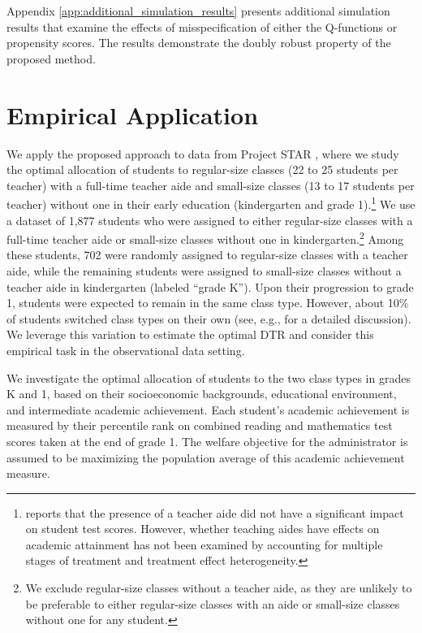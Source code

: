 Appendix \ref{app:additional_simulation_results} presents additional simulation results that examine the effects of misspecification of either the Q-functions or  propensity scores. The results demonstrate the doubly robust property of the proposed method.





\section{Empirical Application}\label{sec:empirical_illustration}

We apply the proposed approach to data from Project STAR 
\citep[e.g.,][]{krueger_1999, Ding_Lehrer_2010}, 
where we study the optimal allocation of students to regular-size classes (22 to 25 students per teacher) with a full-time teacher aide and small-size classes (13 to 17 students per teacher) without one in their early education (kindergarten and grade 1).\footnote{\cite{krueger_1999} reports that the presence of a teacher aide did not have a significant impact on student test scores. However, whether teaching aides have effects on academic attainment has not been examined by accounting for multiple stages of treatment and treatment effect heterogeneity.} We use a dataset of 1,877 students who were assigned to either regular-size classes with a full-time teacher aide or small-size classes without one in kindergarten.\footnote{We exclude regular-size classes without a teacher aide, as they are unlikely to be preferable to either regular-size classes with an aide or small-size classes without one for any student.} Among these students, 702 were randomly assigned to regular-size classes with a teacher aide, while the remaining students were assigned to small-size classes without a teacher aide in kindergarten (labeled ``grade K''). Upon their progression to grade 1, students were expected to remain in the same class type. However, about 10\% of students switched class types on their own (see, e.g., \cite{Ding_Lehrer_2010} for a detailed discussion). We leverage this variation to estimate the optimal DTR and consider this empirical task in the observational data setting.

We investigate the optimal allocation of students to the two class types in grades K and 1, based on their socioeconomic backgrounds, educational environment, and intermediate academic achievement. Each student’s academic achievement is measured by their percentile rank on combined reading and mathematics test scores taken at the end of grade 1. The welfare objective for the administrator is assumed to be maximizing the population average of this academic achievement measure. 

